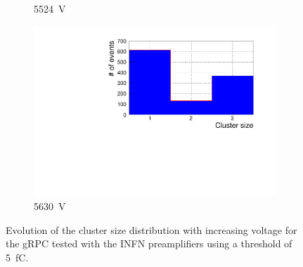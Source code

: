 \begin{figure}[H]
\begin{subfigure}{.33\linewidth}
			\caption{\label{fig:cluster-size-1D:E} \SI{5524}{V}}
		\end{subfigure}
		\begin{subfigure}{.33\linewidth}
		    \centering
			\includegraphics[width=1.1\linewidth]{fig/chapt6/Muon-ClS-1D-5500-gRPC-INFN.pdf}
			\caption{\label{fig:cluster-size-1D:F} \SI{5630}{V}}
		\end{subfigure}
		\caption{\label{fig:cluster-size-1D} Evolution of the cluster size distribution with increasing voltage for the gRPC tested with the INFN preamplifiers using a threshold of \SI{5}{fC}.}
	\end{figure}
	
